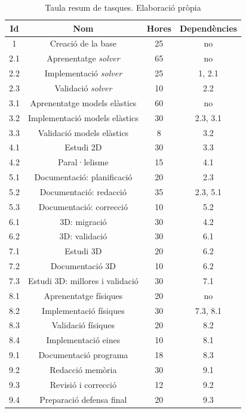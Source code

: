 \documentclass[a4paper]{report}
\begin{document}
	\begin{table}[h!]
		\centering
		\begin{tabular}{|| c || c | c c||}
			\hline
			Id & Nom & Hores & Dependències \\ 
			\hline\hline
			1 & Creació de la base & 25 & no \\
			\hline
			2.1 & Aprenentatge \textit{solver} & 65 & no \\
			2.2 & Implementació \textit{solver} & 25 & 1, 2.1 \\
			2.3 & Validació \textit{solver} & 10 & 2.2 \\
			\hline
			3.1 & Aprenentatge models elàstics & 60 & no \\
			3.2 & Implementació models elàstics & 30 & 2.3, 3.1 \\
			3.3 & Validació models elàstics & 8 & 3.2 \\
			\hline
			4.1 & Estudi 2D & 30 & 3.3 \\
			4.2 & Paral·lelisme & 15 & 4.1 \\
			\hline
			5.1 & Documentació: planificació & 20 & 2.3 \\
			5.2 & Documentació: redacció & 35 & 2.3, 5.1 \\
			5.3 & Documentació: correcció & 10 & 5.2 \\
			\hline
			6.1 & 3D: migració & 30 & 4.2 \\
			6.2 & 3D: validació & 30 & 6.1 \\
			\hline
			7.1 & Estudi 3D & 20 & 6.2 \\
			7.2 & Documentació 3D & 10 & 6.2 \\
			7.3 & Estudi 3D: millores i validació & 30 & 7.1 \\
			\hline
			8.1 & Aprenentatge físiques & 20 & no \\
			8.2 & Implementació físiques & 30 & 7.3, 8.1 \\
			8.3 & Validació físiques & 20 & 8.2 \\
			8.4 & Implementació eines & 10 & 8.1 \\
			\hline
			9.1 & Documentació programa & 18 & 8.3 \\
			9.2 & Redacció memòria & 30 & 9.1 \\
			9.3 & Revisió i correcció & 12 & 9.2 \\
			9.4 & Preparació defensa final & 20 & 9.3 \\
			\hline
		\end{tabular}
	\caption{Taula resum de tasques. Elaboració pròpia}
	\label{table:resumTasques}
	\end{table}
	
\end{document}
